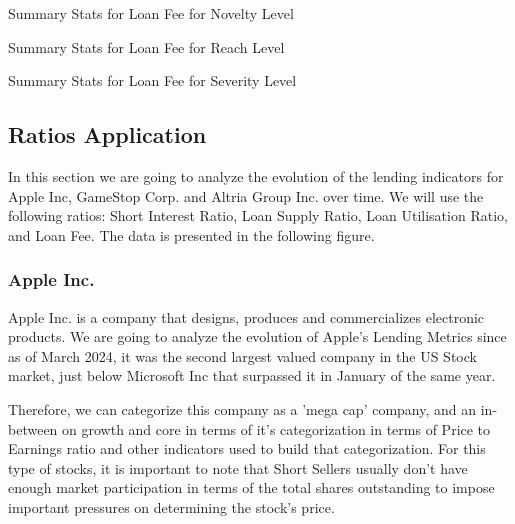 \begin{table}[H]
\caption{Summary Stats for Loan Fee for Novelty Level}
\centering
\resizebox{\textwidth}{!}{

}
\label{table:loan_fee_novelty.tex}
\end{table}

\begin{table}[H]
\caption{Summary Stats for Loan Fee for Reach Level}
\centering
\resizebox{\textwidth}{!}{

}
\label{table:loan_fee_reach.tex}
\end{table}

\begin{table}[H]
\caption{Summary Stats for Loan Fee for Severity Level}
\centering
\resizebox{\textwidth}{!}{

}
\label{table:loan_fee_severity.tex}
\end{table}




\subsection{Ratios Application}

In this section we are going to analyze the evolution of the lending indicators for Apple Inc, GameStop Corp. and Altria Group Inc. over time. We will use the following ratios: Short Interest Ratio, Loan Supply Ratio, Loan Utilisation Ratio, and Loan Fee. The data is presented in the following figure.

\subsubsection{Apple Inc.}

Apple Inc. is a company that designs, produces and commercializes electronic products. We are going to analyze the evolution of Apple's Lending Metrics since as of March 2024, it was the second largest valued company in the US Stock market, just below Microsoft Inc that surpassed it in January of the same year.

Therefore, we can categorize this company as a 'mega cap' company, and an in-between on growth and core in terms of it's categorization in terms of Price to Earnings ratio and other indicators used to build that categorization. For this type of stocks, it is important to note that Short Sellers usually don't have enough market participation in terms of the total shares outstanding to impose important pressures on determining the stock's price.

